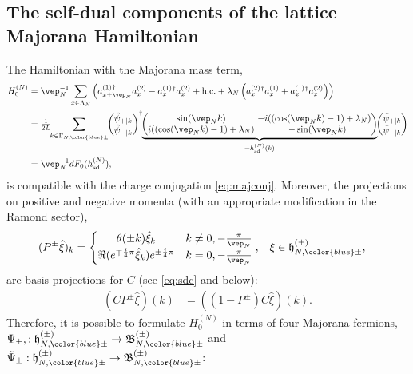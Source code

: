 \documentclass[a4paper, 11pt]{article}
\newcommand{\fB}{\mathfrak{B}}\newcommand{\cB}{\mathcal{B}}\newcommand{\dB}{\mathds{B}}\newcommand{\sB}{\mathscr{B}}
\newcommand{\fh}{\mathfrak{h}}
\DeclareMathOperator{\1}{\mathds{1}}
\DeclareMathOperator{\sd}{sd}
\begin{document}
\subsection{The self-dual components of the lattice Majorana Hamiltonian}
\label{sec:sdc}
The Hamiltonian with the Majorana mass term,
\begin{align}
\label{eq:stagHmaj}
H^{(N)}_{0} & = \vep_{N}^{-1}\sum_{x\in\Lambda_{N}}\left(a^{(1)\!\!\ \dagger}_{x+\vep_{N}}a^{(2)}_{x} - a^{(1)\!\!\ \dagger}_{x}a^{(2)}_{x} + \textup{h.c.} + \lambda_{N}\left(a^{(2)\!\!\ \dagger}_{x}a^{(1)}_{x} + a^{(1)\!\!\ \dagger}_{x}a^{(2)}_{x}\right)\right) \\ \nonumber
 & = \tfrac{1}{2L}\!\!\sum_{k\in\Gamma_{N,{\color{blue}\pm}}}\!\!\begin{pmatrix} \hat{\psi}_{+|k} \\ \hat{\psi}_{-|k} \end{pmatrix}^{\dagger}\!\! \underbrace{\begin{pmatrix} \sin(\vep_{N}k) & \!\!\!\!-i((\cos(\vep_{N}k)-1) + \lambda_{N}) \\ i((\cos(\vep_{N}k)-1) + \lambda_{N}) & -\sin(\vep_{N}k) \end{pmatrix}}_{=h^{(N)}_{\sd}(k)}\!\! \begin{pmatrix} \hat{\psi}_{+|k} \\ \hat{\psi}_{-|k} \end{pmatrix} \\ \nonumber
 & = \vep_{N}^{-1}dF_{0}(h^{(N)}_{\sd}),
\end{align}
is compatible with the charge conjugation \eqref{eq:majconj}. Moreover, the projections on positive and negative momenta (with an appropriate modification in the Ramond sector),
\begin{align}
\label{eq:pmom}
(P^{\pm}\hat{\xi})_{k} & = \left\{\begin{matrix} \theta(\pm k)\hat{\xi}_{k} & k\neq0,-\tfrac{\pi}{\vep_{N}} \\ \Re(e^{\mp\frac{i}{4}\pi}\hat{\xi}_{k})e^{\pm\frac{i}{4}\pi} & k=0,-\tfrac{\pi}{\vep_{N}} \end{matrix} \right., & \xi & \in\fh^{(\pm)}_{N,{\color{blue}\pm}},
\end{align}
are basis projections for $C$ (see \eqref{eq:sdc} and below):
\begin{align}
\label{eq:sdcbasis}
(CP^{\pm}\hat{\xi})(k) & = ((1-P^{\pm})C\hat{\xi})(k).
\end{align}
Therefore, it is possible to formulate $H^{(N)}_{0}$ in terms of four Majorana fermions, $\Psi_{\pm},:\fh^{(\pm)}_{N,{\color{blue}\pm}}\rightarrow\fB^{(\pm)}_{N,{\color{blue}\pm}}$ and $ \tilde{\Psi}_{\pm}:\fh^{(\pm)}_{N,{\color{blue}\pm}}\rightarrow\fB^{(\pm)}_{N,{\color{blue}\pm}}$:
\end{document}
